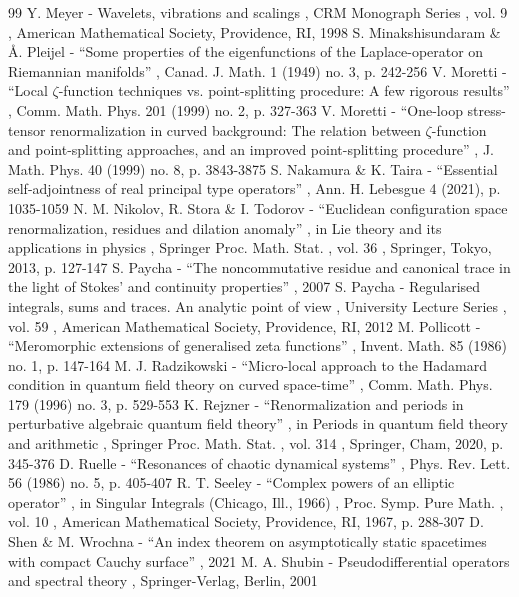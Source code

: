 \begin{thebibliography}{99}
 Y. Meyer - Wavelets, vibrations and scalings , CRM Monograph Series , vol. 9 , American Mathematical Society, Providence, RI, 1998
 S. Minakshisundaram \& Å. Pleijel - “Some properties of the eigenfunctions of the Laplace-operator on Riemannian manifolds” , Canad. J. Math. 1 (1949) no. 3, p. 242-256
 V. Moretti - “Local $\zeta $-function techniques vs. point-splitting procedure: A few rigorous results” , Comm. Math. Phys. 201 (1999) no. 2, p. 327-363
 V. Moretti - “One-loop stress-tensor renormalization in curved background: The relation between $\zeta $-function and point-splitting approaches, and an improved point-splitting procedure” , J. Math. Phys. 40 (1999) no. 8, p. 3843-3875
 S. Nakamura \& K. Taira - “Essential self-adjointness of real principal type operators” , Ann. H. Lebesgue 4 (2021), p. 1035-1059
 N. M. Nikolov, R. Stora \& I. Todorov - “Euclidean configuration space renormalization, residues and dilation anomaly” , in Lie theory and its applications in physics , Springer Proc. Math. Stat. , vol. 36 , Springer, Tokyo, 2013, p. 127-147
 S. Paycha - “The noncommutative residue and canonical trace in the light of Stokes’ and continuity properties” , 2007
 S. Paycha - Regularised integrals, sums and traces. An analytic point of view , University Lecture Series , vol. 59 , American Mathematical Society, Providence, RI, 2012
 M. Pollicott - “Meromorphic extensions of generalised zeta functions” , Invent. Math. 85 (1986) no. 1, p. 147-164
 M. J. Radzikowski - “Micro-local approach to the Hadamard condition in quantum field theory on curved space-time” , Comm. Math. Phys. 179 (1996) no. 3, p. 529-553
 K. Rejzner - “Renormalization and periods in perturbative algebraic quantum field theory” , in Periods in quantum field theory and arithmetic , Springer Proc. Math. Stat. , vol. 314 , Springer, Cham, 2020, p. 345-376
 D. Ruelle - “Resonances of chaotic dynamical systems” , Phys. Rev. Lett. 56 (1986) no. 5, p. 405-407
 R. T. Seeley - “Complex powers of an elliptic operator” , in Singular Integrals (Chicago, Ill., 1966) , Proc. Symp. Pure Math. , vol. 10 , American Mathematical Society, Providence, RI, 1967, p. 288-307
 D. Shen \& M. Wrochna - “An index theorem on asymptotically static spacetimes with compact Cauchy surface” , 2021
 M. A. Shubin - Pseudodifferential operators and spectral theory , Springer-Verlag, Berlin, 2001

\end{thebibliography}
